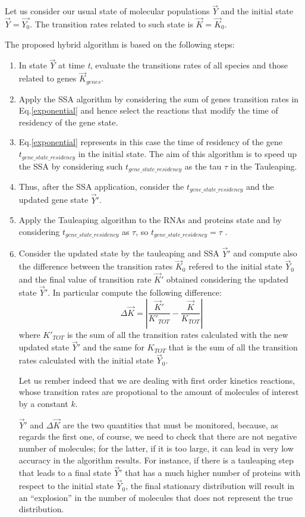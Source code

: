 \documentclass[12pt,a4paper]{report}
\begin{document}
Let us consider our usual state of molecular populations $\Vec{Y}$ and the initial state $\Vec{Y}=\Vec{Y_{0}}$. The transition rates related to such state is $\Vec{K}=\Vec{K}_{0}$.

The proposed hybrid algorithm is based on the following steps:
\begin{enumerate}
 \item In state $\Vec{Y}$ at time \emph{t}, evaluate the transitions rates of all species and those related to genes $\Vec{K}_{genes}$.
 \item Apply the SSA algorithm by considering the sum of genes transition rates in Eq.\ref{exponential} and hence select the reactions that modify the time of residency of the gene state. 
 \item Eq.\ref{exponential} represents in this case the time of residency of the gene $t_{gene\_state\_residency}$ in the initial state. The aim of this algorithm is to speed up the SSA by considering such $t_{gene\_state\_residency}$ as the tau $\tau$ in the Tauleaping.
 \item Thus, after the SSA application, consider the $t_{gene\_state\_residency}$ and the updated gene state $\Vec{Y}'$.
 \item Apply the Tauleaping algorithm to the RNAs and proteins state and by considering $t_{gene\_state\_residency}$ as $\tau$, so $t_{gene\_state\_residency} = \tau$ .
 
 \item Consider the updated state by the tauleaping and SSA $\Vec{Y}'$ and compute also the difference between the transition rates $\Vec{K}_{0}$ refered to the initial state $\Vec{Y}_{0}$ and the final value of transition rate $\Vec{K}'$ obtained considering the updated state $\Vec{Y}'$. In particular compute the following difference:
 \begin{equation}
  \Delta \Vec{K} = \left|\frac{\Vec{K}'}{K'_{TOT}}-\frac{\Vec{K}}{K_{TOT}}\right|
 \end{equation}
where $K'_{TOT}$ is the sum of all the transition rates calculated with the new updated state $\Vec{Y}'$ and the same for $K_{TOT}$ that is the sum of all the transition rates calculated with the initial state $\Vec{Y}_{0}$.

Let us rember indeed that we are dealing with first order kinetics reactions, whose transition rates are propotional to the amount of molecules of interest by a constant $k$.

$\Vec{Y}'$ and $\Delta \Vec{K}$ are the two quantities that must be monitored, because, as regards the first one, of course, we need to check that there are not negative number of molecules; for the latter, if it is too large, it can lead in very low accuracy in the algorithm results. For instance, if there is a tauleaping step that leads to a final state $\Vec{Y}'$ that has a much higher number of proteins with respect to the initial state $\Vec{Y}_{0}$, the final stationary distribution will result in an ``explosion'' in the number of molecules that does not represent the true distribution. 


\end{enumerate}
\end{document}

